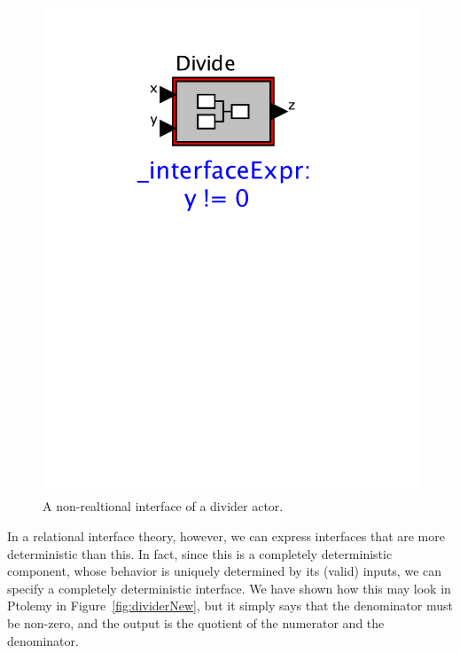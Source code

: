 \documentclass[preprint,11pt]{sigplanconf}
\begin{document}
\begin{figure}[htbp]
\centering
\includegraphics[scale=0.55]{figs/divideSimplest}
\caption{A non-realtional interface of a divider actor.}
\label{fig:dividerOld}
\end{figure}
\cite{ptII}
In a relational interface theory, however, we can express interfaces that are
more deterministic than this.  In fact, since this is a completely
deterministic component, whose behavior is uniquely determined by its (valid)
inputs, we can specify a completely deterministic interface.  We have shown how
this may look in Ptolemy in Figure~\ref{fig:dividerNew}, but it simply says
that the denominator must be non-zero, and the output is the quotient of the
numerator and the denominator.
\end{document}
